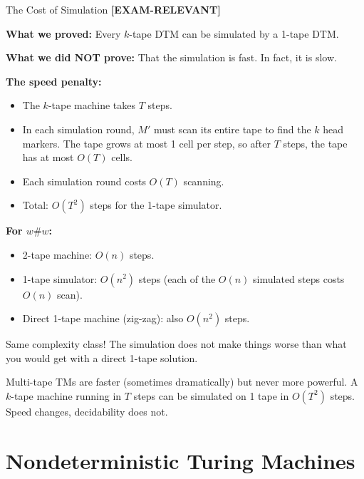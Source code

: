\documentclass[11pt,a4paper]{article}
\newcommand{\kemark}{\textcolor{red!70!black}{\textbf{[EXAM-RELEVANT]}}}
\newcommand{\kt}[1]{\par\vspace{0.3em}\colorbox{yellow!60}{\parbox{\dimexpr\linewidth-2\fboxsep}{#1}}\vspace{0.3em}}
\begin{document}
\begin{conceptbox}{The Cost of Simulation \kemark}

\textbf{What we proved:} Every $k$-tape DTM can be simulated by a 1-tape DTM.

\textbf{What we did NOT prove:} That the simulation is fast. In fact, it is slow.

\textbf{The speed penalty:}
\begin{itemize}[nosep]
\item The $k$-tape machine takes $T$ steps.
\item In each simulation round, $M'$ must scan its entire tape to find the $k$ head markers. The tape grows at most 1 cell per step, so after $T$ steps, the tape has at most $O(T)$ cells.
\item Each simulation round costs $O(T)$ scanning.
\item Total: $O(T^2)$ steps for the 1-tape simulator.
\end{itemize}

\textbf{For $w\#w$:}
\begin{itemize}[nosep]
\item 2-tape machine: $O(n)$ steps.
\item 1-tape simulator: $O(n^2)$ steps (each of the $O(n)$ simulated steps costs $O(n)$ scan).
\item Direct 1-tape machine (zig-zag): also $O(n^2)$ steps.
\end{itemize}

Same complexity class! The simulation does not make things worse than what you would get with a direct 1-tape solution.

\kt{Multi-tape TMs are faster (sometimes dramatically) but never more powerful. A $k$-tape machine running in $T$ steps can be simulated on 1 tape in $O(T^2)$ steps. Speed changes, decidability does not.}
\end{conceptbox}

\newpage

\section{Nondeterministic Turing Machines}
\end{document}
